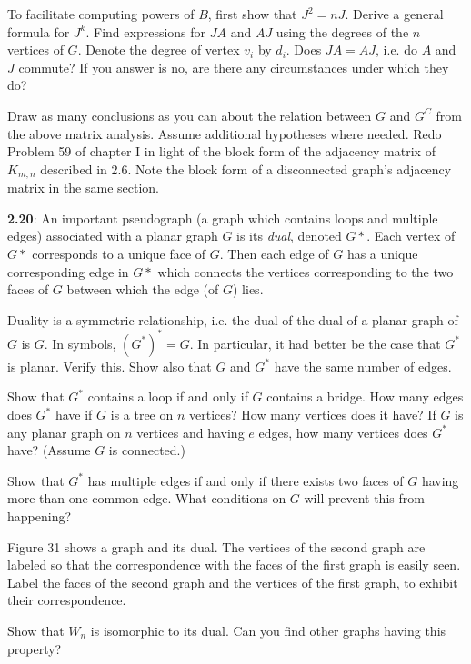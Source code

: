 \documentclass{article}
\begin{document}
To facilitate computing powers of $B$, first show that $J^2=nJ$. Derive a general formula for $J^k$. Find expressions for $JA$ and $AJ$ using the degrees of the $n$ vertices of $G$. Denote the degree of vertex $v_i$ by $d_i$. Does $JA=AJ$, i.e. do $A$ and $J$ commute? If you answer is no, are there any circumstances under which they do?

Draw as many conclusions as you can about the relation between $G$ and $G^C$ from the above matrix analysis. Assume additional hypotheses where needed. Redo Problem 59 of chapter I in light of the block form of the adjacency matrix of $K_{m,n}$ described in 2.6. Note the block form of a disconnected graph's adjacency matrix in the same section.

\vspace{0.5cm}

\textbf{2.20}: An important pseudograph (a graph which contains loops and multiple edges) associated with a planar graph $G$ is its \emph{dual}, denoted $G*$. Each vertex of $G*$ corresponds to a unique face of $G$. Then each edge of $G$ has a unique corresponding edge in $G*$ which connects the vertices corresponding to the two faces of $G$ between which the edge (of $G$) lies.

Duality is a symmetric relationship, i.e. the dual of the dual of a planar graph of $G$ is $G$. In symbols, $(G^*)^*=G$. In particular, it had better be the case that $G^*$ is planar. Verify this. Show also that $G$ and $G^*$ have the same number of edges.

Show that $G^*$ contains a loop if and only if $G$ contains a bridge. How many edges does $G^*$ have if $G$ is a tree on $n$ vertices? How many vertices does it have? If $G$ is any planar graph on $n$ vertices and having $e$ edges, how many vertices does $G^*$ have? (Assume $G$ is connected.)

Show that $G^*$ has multiple edges if and only if there exists two faces of $G$ having more than one common edge. What conditions on $G$ will prevent this from happening?

Figure 31 shows a graph and its dual. The vertices of the second graph are labeled so that the correspondence with the faces of the first graph is easily seen. Label the faces of the second graph and the vertices of the first graph, to exhibit their correspondence.

Show that $W_n$ is isomorphic to its dual. Can you find other graphs having this property?
\end{document}
